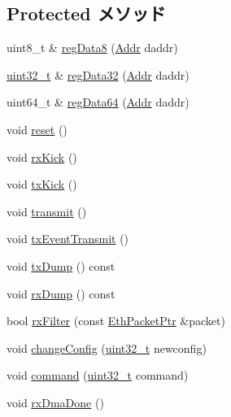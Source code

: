 \subsection*{Protected メソッド}
\begin{DoxyCompactItemize}
\item 
uint8\_\-t \& \hyperlink{classSinic_1_1Device_ab9d3fc8abcb0bc9a41665d6311d64106}{regData8} (\hyperlink{base_2types_8hh_af1bb03d6a4ee096394a6749f0a169232}{Addr} daddr)
\item 
\hyperlink{Type_8hh_a435d1572bf3f880d55459d9805097f62}{uint32\_\-t} \& \hyperlink{classSinic_1_1Device_af3697c3ddcc9030231a62c95ddcd193b}{regData32} (\hyperlink{base_2types_8hh_af1bb03d6a4ee096394a6749f0a169232}{Addr} daddr)
\item 
uint64\_\-t \& \hyperlink{classSinic_1_1Device_a107fa1384335bcf976734520e213a501}{regData64} (\hyperlink{base_2types_8hh_af1bb03d6a4ee096394a6749f0a169232}{Addr} daddr)
\item 
void \hyperlink{classSinic_1_1Device_ad20897c5c8bd47f5d4005989bead0e55}{reset} ()
\item 
void \hyperlink{classSinic_1_1Device_a5fa946a73db6f59c9819d457c991486a}{rxKick} ()
\item 
void \hyperlink{classSinic_1_1Device_ac5484e8debdd6a2d3cf4c2902b832a76}{txKick} ()
\item 
void \hyperlink{classSinic_1_1Device_af04463ca216d10ffa94db8463cee04c9}{transmit} ()
\item 
void \hyperlink{classSinic_1_1Device_a2b61c48d7a63b50007517c67e35dfd20}{txEventTransmit} ()
\item 
void \hyperlink{classSinic_1_1Device_afe787c5d7928546256f34b65f485be32}{txDump} () const 
\item 
void \hyperlink{classSinic_1_1Device_aa1b380dc961134ace0f88ee7743b32b6}{rxDump} () const 
\item 
bool \hyperlink{classSinic_1_1Device_a5bcec2e17f6aca766b063f7a92289bdb}{rxFilter} (const \hyperlink{classRefCountingPtr}{EthPacketPtr} \&packet)
\item 
void \hyperlink{classSinic_1_1Device_abac0082da5c2420162cd3d183fab4f1f}{changeConfig} (\hyperlink{Type_8hh_a435d1572bf3f880d55459d9805097f62}{uint32\_\-t} newconfig)
\item 
void \hyperlink{classSinic_1_1Device_a8747db3299e3afcb225c4e64f725f453}{command} (\hyperlink{Type_8hh_a435d1572bf3f880d55459d9805097f62}{uint32\_\-t} command)
\item 
void \hyperlink{classSinic_1_1Device_ae8fff6d9b2bdd860ce365599560f67e7}{rxDmaDone} ()

\end{DoxyCompactItemize}
